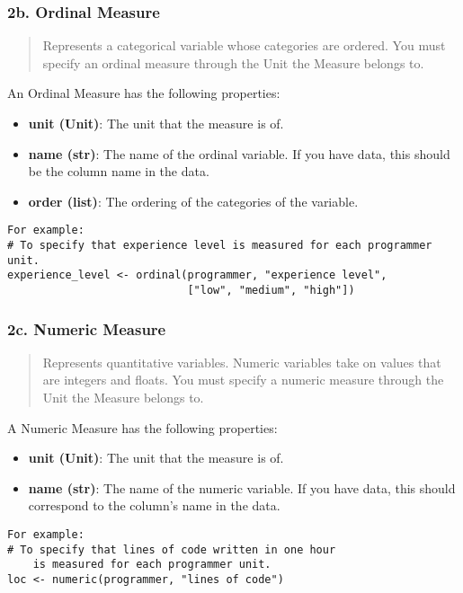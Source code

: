 \subsubsection{2b. Ordinal Measure}

\begin{quote}
Represents a categorical variable whose categories are ordered. You must
specify an ordinal measure through the Unit the Measure belongs to.
\end{quote}

An Ordinal Measure has the following properties:
\begin{itemize}
    \item \textbf{unit (Unit)}: The unit that the measure is of.
    \item \textbf{name (str)}: The name of the ordinal variable. If you have data, this should be the column name in the data.
    \item \textbf{order (list)}: The ordering of the categories of the variable.
\end{itemize}

\begin{verbatim}
For example:
# To specify that experience level is measured for each programmer unit.
experience_level <- ordinal(programmer, "experience level", 
                            ["low", "medium", "high"])
\end{verbatim}

\subsubsection{2c. Numeric Measure}\label{c.-numeric-measure}

\begin{quote}
Represents quantitative variables. Numeric variables take on values that
are integers and floats. You must specify a numeric measure through the
Unit the Measure belongs to.
\end{quote}

A Numeric Measure has the following properties:
\begin{itemize}
    \item \textbf{unit (Unit)}: The unit that the measure is of.
    \item \textbf{name (str)}: The name of the numeric variable. If you have data, this should correspond to the column’s name in the data.
\end{itemize}

\begin{verbatim}
For example:
# To specify that lines of code written in one hour 
    is measured for each programmer unit.
loc <- numeric(programmer, "lines of code")
\end{verbatim}

